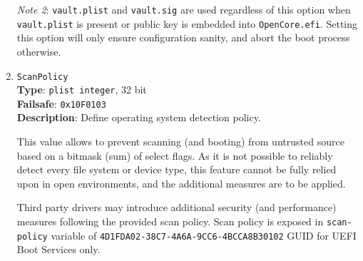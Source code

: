 \documentclass[]{article}
\begin{document}
\begin{enumerate}
  \emph{Note 2}: \texttt{vault.plist} and \texttt{vault.sig} are used regardless of this
  option when \texttt{vault.plist} is present or public key is embedded into
  \texttt{OpenCore.efi}. Setting this option will only ensure configuration sanity,
  and abort the boot process otherwise.

\item
  \texttt{ScanPolicy}\\
  \textbf{Type}: \texttt{plist\ integer}, 32 bit\\
  \textbf{Failsafe}: \texttt{0x10F0103}\\
  \textbf{Description}: Define operating system detection policy.

  This value allows to prevent scanning (and booting) from untrusted
  source based on a bitmask (sum) of select flags. As it is not possible
  to reliably detect every file system or device type, this feature
  cannot be fully relied upon in open environments, and the additional
  measures are to be applied.

  Third party drivers may introduce additional security (and performance)
  measures following the provided scan policy. Scan policy is exposed
  in \texttt{scan-policy} variable of \texttt{4D1FDA02-38C7-4A6A-9CC6-4BCCA8B30102}
  GUID for UEFI Boot Services only.


\end{enumerate}
\end{document}
